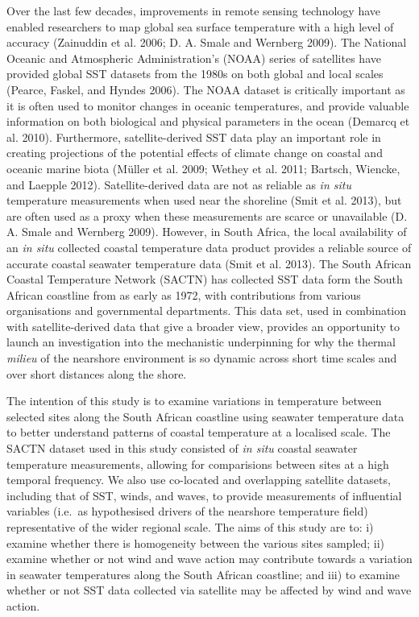 \documentclass[12pt,A4paper,]{article}
\begin{document}
Over the last few decades, improvements in remote sensing technology
have enabled researchers to map global sea surface temperature with a
high level of accuracy (Zainuddin et al. 2006; D. A. Smale and Wernberg
2009). The National Oceanic and Atmospheric Administration's (NOAA)
series of satellites have provided global SST datasets from the 1980s on
both global and local scales (Pearce, Faskel, and Hyndes 2006). The NOAA
dataset is critically important as it is often used to monitor changes
in oceanic temperatures, and provide valuable information on both
biological and physical parameters in the ocean (Demarcq et al. 2010).
Furthermore, satellite-derived SST data play an important role in
creating projections of the potential effects of climate change on
coastal and oceanic marine biota (Müller et al. 2009; Wethey et al.
2011; Bartsch, Wiencke, and Laepple 2012). Satellite-derived data are
not as reliable as \emph{in situ} temperature measurements when used
near the shoreline (Smit et al. 2013), but are often used as a proxy
when these measurements are scarce or unavailable (D. A. Smale and
Wernberg 2009). However, in South Africa, the local availability of an
\emph{in situ} collected coastal temperature data product provides a
reliable source of accurate coastal seawater temperature data (Smit et
al. 2013). The South African Coastal Temperature Network (SACTN) has
collected SST data form the South African coastline from as early as
1972, with contributions from various organisations and governmental
departments. This data set, used in combination with satellite-derived
data that give a broader view, provides an opportunity to launch an
investigation into the mechanistic underpinning for why the thermal
\emph{milieu} of the nearshore environment is so dynamic across short
time scales and over short distances along the shore.

The intention of this study is to examine variations in temperature
between selected sites along the South African coastline using seawater
temperature data to better understand patterns of coastal temperature at
a localised scale. The SACTN dataset used in this study consisted of
\emph{in situ} coastal seawater temperature measurements, allowing for
comparisions between sites at a high temporal frequency. We also use
co-located and overlapping satellite datasets, including that of SST,
winds, and waves, to provide measurements of influential variables
(i.e.~as hypothesised drivers of the nearshore temperature field)
representative of the wider regional scale. The aims of this study are
to: i) examine whether there is homogeneity between the various sites
sampled; ii) examine whether or not wind and wave action may contribute
towards a variation in seawater temperatures along the South African
coastline; and iii) to examine whether or not SST data collected via
satellite may be affected by wind and wave action.
\end{document}
